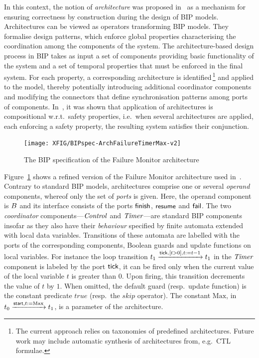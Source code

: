 \documentclass{lncs/llncs}
\newcommand{\mdash}{---}
\newcommand{\ie}[1][\ ]{i.e.#1}
\newcommand{\eg}[1][\ ]{e.g.#1}
\newcommand{\wrt}[1][\ ]{w.r.t.#1}
\newcommand{\resp}[1][\ ]{resp.#1}
\newcommand{\goesto}[2][]{\ensuremath{\xrightarrow[#1]{#2}}}
\newcommand{\true}{\ensuremath{\mathit{true}}}
\begin{document}
In this context, the notion of \emph{architecture} was proposed
in~\cite{AttieBBJS16-architectures-faoc} as a mechanism for ensuring
correctness by construction during the design of BIP models.
Architectures can be viewed as operators transforming BIP models.
They formalise design patterns, which enforce global properties
characterising the coordination among the components of the system.
The architecture-based design process in BIP takes as input a set of
components providing basic functionality of the system and a set of
temporal properties that must be enforced in the final system.  For
each property, a corresponding architecture is identified\,\footnote{%
%
  The current approach relies on taxonomies of predefined
  architectures.  Future work may include automatic synthesis of
  architectures from, \eg CTL~\cite{BaierKatoen2008} formulae.
%
} and applied to the model, thereby potentially introducing additional
coordinator components and modifying the connectors that define
synchronisation patterns among ports of components.
In~\cite{AttieBBJS16-architectures-faoc}, it was shown that
application of architectures is compositional \wrt safety properties,
\ie when several architectures are applied, each enforcing a safety
property, the resulting system satisfies their conjunction.

\begin{figure}[t]
  \centering
  \texttt{[image: XFIG/BIPspec-ArchFailureTimerMax-v2]}
  \caption{The BIP specification of the Failure Monitor architecture}
  \label{schema:ArchFailure:BIP}
\end{figure}

Figure~\ref{schema:ArchFailure:BIP} shows a refined version of the
Failure Monitor architecture used in~\cite{CubETH-case-study}.
Contrary to standard BIP models, architectures comprise one or several
\emph{operand} components, whereof only the set of \emph{ports} is
given.  Here, the operand component is $B$ and its interface
consists of the ports $\mathsf{finish}$, $\mathsf{resume}$ and $\mathsf{fail}$.
The two \emph{coordinator} components\mdash $\mathit{Control}$ and
$\mathit{Timer}$\mdash are standard BIP components insofar as they also
have their \emph{behaviour} specified by finite automata extended with
local data variables.  Transitions of these automata are labelled with
the ports of the corresponding components, Boolean guards and update
functions on local variables.  For instance the loop transition
$\tstate{1} \goesto{\PortTick, \GuardTick[], \TimerUpd[]} \tstate{1}$
in the $\mathit{Timer}$ component is labeled by the port $\mathsf{tick}$, it
can be fired only when the current value of the local variable $t$ is
greater than $0$.  Upon firing, this transition decrements the value
of $t$ by $1$.  When omitted, the default guard (\resp update
function) is the constant predicate $\true$ (\resp the $\mathit{skip}$
operator).  The constant $\mathrm{Max}$, in $\tstate{0}
\goesto{\PortStart, \TimerInit[]} \tstate{1}$, is a parameter of the
architecture.
\end{document}

